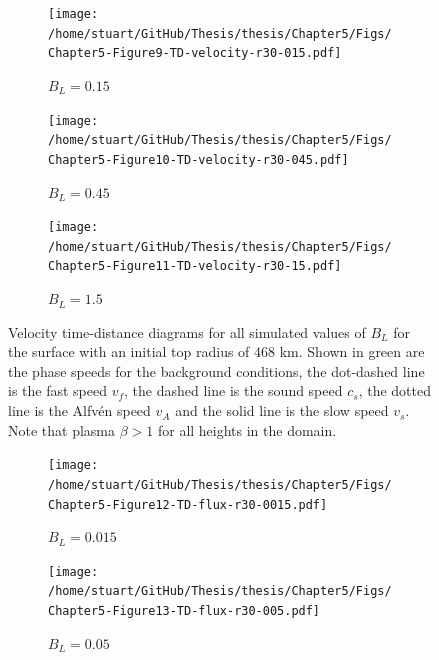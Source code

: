\documentclass[a4paper,12pt,fourier,authoryear,custommargin]{Classes/PhDThesisPSnPDF}
\begin{document}
\begin{figure}
    \centering
\ContinuedFloat
    

    \begin{subfigure}[b]{0.9\columnwidth}
        \texttt{[image: /home/stuart/GitHub/Thesis/thesis/Chapter5/Figs/Chapter5-Figure9-TD-velocity-r30-015.pdf]}
        \caption{$B_L = 0.15$}
        \label{fig:TD-velocity-r30-015}
    \end{subfigure}

    \begin{subfigure}[b]{0.9\columnwidth}
        \texttt{[image: /home/stuart/GitHub/Thesis/thesis/Chapter5/Figs/Chapter5-Figure10-TD-velocity-r30-045.pdf]}
        \caption{$B_L = 0.45$}
        \label{fig:TD-velocity-r30-045}
    \end{subfigure}
    \caption{}
    \label{fig:}
\end{figure}

\begin{figure}
    \centering
\ContinuedFloat
    

    \begin{subfigure}[b]{0.9\columnwidth}
        \texttt{[image: /home/stuart/GitHub/Thesis/thesis/Chapter5/Figs/Chapter5-Figure11-TD-velocity-r30-15.pdf]}
        \caption{$B_L = 1.5$}
        \label{fig:TD-velocity-r30-15}
    \end{subfigure}
    \caption{Velocity time-distance diagrams for all simulated values of $B_L$ for the surface with an initial top radius of $468$ km. Shown in green are the phase speeds for the background conditions, the dot-dashed line is the fast speed $v_f$, the dashed line is the sound speed $c_s$, the dotted line is the Alfv\'en speed $v_A$ and the solid line is the slow speed $v_s$. Note that plasma $\beta > 1$ for all heights in the domain.}
    \label{fig:TD-velocity-r30}
\end{figure}



\begin{figure}
    \centering
    

    \begin{subfigure}[b]{0.9\columnwidth}
        \texttt{[image: /home/stuart/GitHub/Thesis/thesis/Chapter5/Figs/Chapter5-Figure12-TD-flux-r30-0015.pdf]}
        \caption{$B_L = 0.015$}
        \label{fig:TD-flux-r30-0015}
    \end{subfigure}

    \begin{subfigure}[b]{0.9\columnwidth}
        \texttt{[image: /home/stuart/GitHub/Thesis/thesis/Chapter5/Figs/Chapter5-Figure13-TD-flux-r30-005.pdf]}
        \caption{$B_L = 0.05$}
        \label{fig:TD-flux-r30-005}
    \end{subfigure}
    \caption{}
    \label{fig:}
\end{figure}
\end{document}
